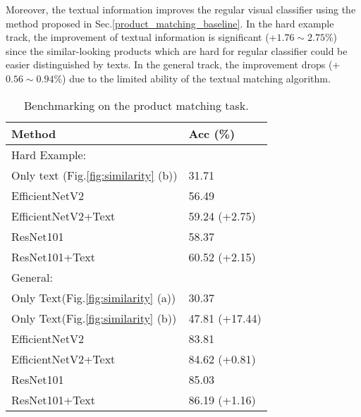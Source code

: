 \documentclass[runningheads]{llncs}
\begin{document}
Moreover, the textual information improves the regular visual classifier using the method proposed in Sec.\ref{product_matching_baseline}. In the hard example track, the improvement of textual information is significant (+$1.76\sim 2.75\%$) since the similar-looking products which are hard for regular classifier could be easier distinguished by texts. In the general track, the improvement drops (+$0.56\sim 0.94\%$) due to the limited ability of the textual matching algorithm. 

\begin{table}[t]
    \begin{minipage}{0.48\columnwidth}
    \centering
    \caption{Benchmarking on the product matching task. }
    \begin{tabular}{l|l}
        \hline \hline
        Method                                       & Acc (\%)  \\ \hline
        Hard Example:                                         \\ 
        Only text (Fig.\ref{fig:similarity} (b))    & 31.71             \\
        EfficientNetV2  \cite{efficientnetv2}                         & 56.49  \\
        EfficientNetV2+Text                         & 59.24 (+2.75)   \\
        ResNet101      \cite{ResNet,pan2018IBNNet}                            & 58.37      \\
        ResNet101+Text                             & 60.52 (+2.15)      \\
        General:  \\
        Only Text(Fig.\ref{fig:similarity} (a))     & 30.37           \\
        Only Text(Fig.\ref{fig:similarity} (b))     & 47.81 (+17.44)           \\
        EfficientNetV2                      & 83.81         \\
        EfficientNetV2+Text                         & 84.62 (+0.81) \\
        ResNet101                          & 85.03              \\
        ResNet101+Text                             & 86.19 (+1.16)      \\
        \hline
    \end{tabular}
    
    \label{tab:match_hard_example}
    \end{minipage}
    \hfill
    \begin{minipage}{0.48\columnwidth}
    \centering
    

\end{minipage}
\end{table}
\end{document}
